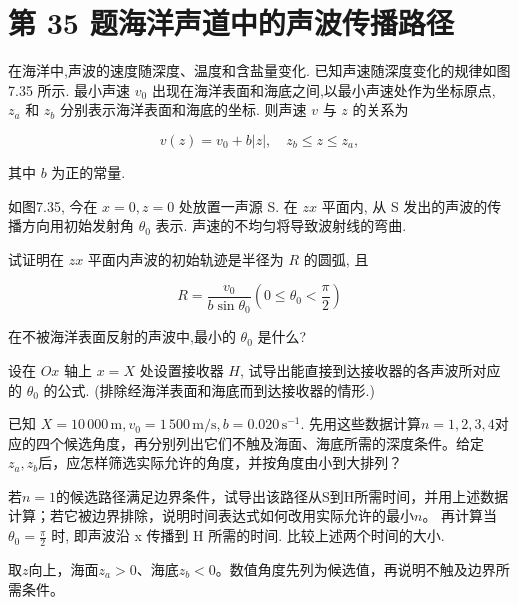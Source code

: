 \documentclass[UTF8,fontset=fandol,a4paper,11pt]{ctexart}
\newcommand{\tagline}[1]{\noindent{\small\color{muted}#1}\par}
\begin{document}
\clearpage


\section*{第 35 题\quad 海洋声道中的声波传播路径}

\tagline{M-07-35}

在海洋中,声波的速度随深度、温度和含盐量变化.
已知声速随深度变化的规律如图7.35 所示. 最小声速 \(v_{0}\)
出现在海洋表面和海底之间,以最小声速处作为坐标原点, \(z_{a}\) 和
\(z_{b}\) 分别表示海洋表面和海底的坐标. 则声速 \(v\) 与 \(z\) 的关系为

\[v(z)=v_0+b|z|,\quad z_b\le z\le z_a,\]

其中 \(b\) 为正的常量.

如图7.35, 今在 \(x=0, z=0\) 处放置一声源 S. 在 \(zx\) 平面内, 从 S
发出的声波的传播方向用初始发射角 \(\theta_0\) 表示.
声速的不均匀将导致波射线的弯曲.

试证明在 \(zx\) 平面内声波的初始轨迹是半径为 \(R\) 的圆弧, 且

\[
R=\frac{v_{0}}{b\sin\theta_{0}}\left(0\leqslant\theta_{0}<\frac{\pi}{2}\right)
\]

在不被海洋表面反射的声波中,最小的 \(\theta_{0}\) 是什么?

设在 \(Ox\) 轴上 \(x=X\) 处设置接收器 \(H\),
试导出能直接到达接收器的各声波所对应的 \(\theta_{0}\) 的公式.
(排除经海洋表面和海底而到达接收器的情形.)

已知
\(X=10\,000\, \mathrm{m}, v_0=1\,500\, \mathrm{m/s}, b=0.020\, \mathrm{s}^{-1}\).
先用这些数据计算$n=1,2,3,4$对应的四个候选角度，再分别列出它们不触及海面、海底所需的深度条件。给定$z_a,z_b$后，应怎样筛选实际允许的角度，并按角度由小到大排列？

若$n=1$的候选路径满足边界条件，试导出该路径从S到H所需时间，并用上述数据计算；若它被边界排除，说明时间表达式如何改用实际允许的最小$n$。 再计算当
\(\theta_{0}=\frac{\pi}{2}\) 时, 即声波沿 x 传播到 H 所需的时间.
比较上述两个时间的大小.

取\(z\)向上，海面\(z_a>0\)、海底\(z_b<0\)。数值角度先列为候选值，再说明不触及边界所需条件。
\end{document}

